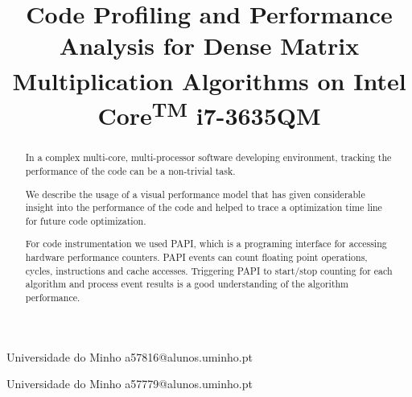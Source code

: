 \documentclass{sigplanconf}
\begin{document}
\setlength{\pdfpageheight}{\paperheight}
\setlength{\pdfpagewidth}{\paperwidth}






\title{ Code Profiling and Performance Analysis for Dense Matrix Multiplication Algorithms on Intel\textsuperscript{\textregistered} Core\textsuperscript{TM} i7-3635QM  }

\subtitle{}

           {Universidade do Minho}
           {a57816@alunos.uminho.pt}
           
           {Universidade do Minho}
           {a57779@alunos.uminho.pt}

\maketitle

\begin{abstract}
In a complex multi-core, multi-processor software developing environment, tracking the performance of the code can be a non-trivial task.\par 
We describe the usage of a visual performance model that has given considerable insight into the performance of the code and helped to trace a optimization time line for future code optimization.\par 
For code instrumentation we used PAPI\cite{papi}, which is a programing interface for accessing hardware performance counters. PAPI events can count floating point operations, cycles, instructions and cache accesses. Triggering PAPI to start/stop counting for each algorithm and process event results is a good understanding of the algorithm performance. \end{abstract}
\end{document}
